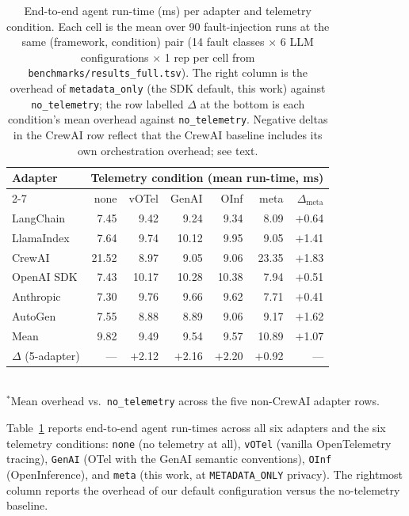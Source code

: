 \documentclass[sigconf,review,anonymous,9pt]{acmart}
\begin{document}
\begin{table}[t]
\centering
\small
\caption{End-to-end agent run-time (ms) per adapter and telemetry
condition. Each cell is the mean over 90 fault-injection runs at the
same (framework, condition) pair (14 fault classes $\times$ 6 LLM
configurations $\times$ 1 rep per cell from
\texttt{benchmarks/results\_full.tsv}). The right column is the
overhead of \texttt{metadata\_only} (the SDK default, this work)
against \texttt{no\_telemetry}; the row labelled $\Delta$ at the
bottom is each condition's mean overhead against \texttt{no\_telemetry}.
Negative deltas in the CrewAI row reflect that the CrewAI baseline
includes its own orchestration overhead; see text.}
\label{tab:e2e}
\begin{tabular}{@{}lrrrrrr@{}}
\toprule
\textbf{Adapter} & \multicolumn{6}{c}{\textbf{Telemetry condition (mean run-time, ms)}} \\
\cmidrule(l){2-7}
            & none & vOTel & GenAI & OInf & meta  & $\Delta_{\text{meta}}$ \\
\midrule
LangChain   & 7.45 & 9.42 & 9.24 & 9.34 & 8.09 & $+$0.64 \\
LlamaIndex  & 7.64 & 9.74 &10.12 & 9.95 & 9.05 & $+$1.41 \\
CrewAI      &21.52 & 8.97 & 9.05 & 9.06 &23.35 & $+$1.83 \\
OpenAI SDK  & 7.43 &10.17 &10.28 &10.38 & 7.94 & $+$0.51 \\
Anthropic   & 7.30 & 9.76 & 9.66 & 9.62 & 7.71 & $+$0.41 \\
AutoGen     & 7.55 & 8.88 & 8.89 & 9.06 & 9.17 & $+$1.62 \\
\midrule
Mean        & 9.82 & 9.49 & 9.54 & 9.57 &10.89 & $+$1.07 \\
$\Delta$ (5-adapter)\rlap{$^{\ast}$} & --- & $+$2.12 & $+$2.16 & $+$2.20 & $+$0.92 & --- \\
\bottomrule
\end{tabular}
\\[1mm]
{\footnotesize $^{\ast}$Mean overhead vs.\ \texttt{no\_telemetry}
across the five non-CrewAI adapter rows.}
\end{table}

Table~\ref{tab:e2e} reports end-to-end agent run-times across all
six adapters and the six telemetry conditions: \texttt{none} (no
telemetry at all), \texttt{vOTel} (vanilla OpenTelemetry tracing),
\texttt{GenAI} (OTel with the GenAI semantic conventions),
\texttt{OInf} (OpenInference), and \texttt{meta} (this work, at
\texttt{METADATA\_ONLY} privacy). The rightmost column reports the
overhead of our default configuration versus the no-telemetry
baseline.
\end{document}
